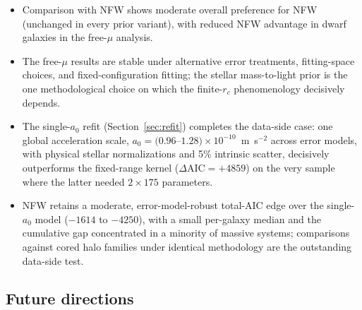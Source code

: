 \documentclass[11pt,a4paper]{article}
\begin{document}
\begin{itemize}
  and coincides with the observed dark-energy scale: an unexplained
  but robust coincidence between two \emph{observed} numbers, owing
  nothing to this framework, whose own mechanisms for both sides
  are now terminated (galactic: the leading-order response
  computations above; dark-energy: the companion paper's C2a
  measurement)---the joint-falsifiability structure of earlier
  versions, cashed in the double-negative direction.  A fixed-range
  interpretation is independently excluded by Solar-System
  fifth-force bounds.
\item Comparison with NFW shows moderate overall preference for NFW
  (unchanged in every prior variant), with reduced NFW advantage in
  dwarf galaxies in the free-$\mu$ analysis.
\item The free-$\mu$ results are stable under alternative error
  treatments, fitting-space choices, and fixed-configuration
  fitting; the stellar mass-to-light prior is the one
  methodological choice on which the finite-$r_c$ phenomenology
  decisively depends.
\item The single-$a_0$ refit (Section~\ref{sec:refit}) completes
  the data-side case: one global acceleration scale,
  $a_0 = (0.96$--$1.28)\times10^{-10}$~m~s$^{-2}$ across error
  models, with physical stellar normalizations and 5\% intrinsic
  scatter, decisively outperforms the fixed-range kernel
  ($\Delta\mathrm{AIC} = +4859$) on the very sample where the
  latter needed $2\times175$ parameters.
\item NFW retains a moderate, error-model-robust total-AIC edge
  over the single-$a_0$ model ($-1614$ to $-4250$), with a small
  per-galaxy median and the cumulative gap concentrated in a
  minority of massive systems; comparisons against cored halo
  families under identical methodology are the outstanding
  data-side test.
\end{itemize}

\subsection{Future directions}
\label{sec:future}
\end{document}
